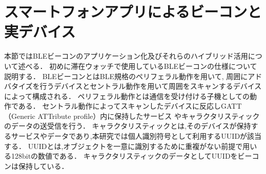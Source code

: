  \clearpage
\section{スマートフォンアプリによるビーコンと実デバイス}\label{4.3}
本節ではBLEビーコンのアプリケーション化及びそれらのハイブリッド活用について述べる．
初めに滞在ウォッチで使用しているBLEビーコンの仕様について説明する．
BLEビーコンとはBLE規格のペリフェラル動作を用いて,
周囲にアドバタイズを行うデバイスとセントラル動作を用いて周囲をスキャンするデバイスによって構成される．
ペリフェラル動作とは通信を受け付ける子機としての動作である．
セントラル動作によってスキャンしたデバイスに反応しGATT（Generic ATTribute profile）内に保持したサービス
やキャラクタリスティックのデータの送受信を行う．
キャラクタリスティックとは,そのデバイスが保持するサービスやデータであり,本研究では個人識別符号として利用するUUIDが該当する．
UUIDとは,オブジェクトを一意に識別するために重複がない前提で用いる128bitの数値である．
キャラクタリスティックのデータとしてUUIDをビーコンは保持している．









